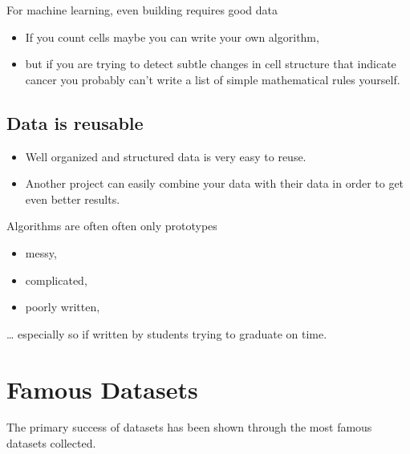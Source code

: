 \documentclass[letterpaper,10pt,english]{sphinxmanual}
\begin{document}
\sphinxAtStartPar
For machine learning, even building requires good data
\begin{itemize}
\item {} 
\sphinxAtStartPar
If you count cells maybe you can write your own algorithm,

\item {} 
\sphinxAtStartPar
but if you are trying to detect subtle changes in cell structure that indicate cancer you probably can’t write a list of simple mathematical rules yourself.

\end{itemize}


\section{Data is reusable}
\label{\detokenize{03-Datasets:data-is-reusable}}\begin{itemize}
\item {} 
\sphinxAtStartPar
Well organized and structured data is very easy to reuse.

\item {} 
\sphinxAtStartPar
Another project can easily combine your data with their data in order to get even better results.

\end{itemize}

\sphinxAtStartPar
Algorithms are often often only prototypes
\begin{itemize}
\item {} 
\sphinxAtStartPar
messy,

\item {} 
\sphinxAtStartPar
complicated,

\item {} 
\sphinxAtStartPar
poorly written,

\end{itemize}

\sphinxAtStartPar
… especially so if written by students trying to graduate on time.





\sphinxAtStartPar
{}






\chapter{Famous Datasets}
\label{\detokenize{03-Datasets:famous-datasets}}
\sphinxAtStartPar
The primary success of datasets has been shown through the most famous datasets collected.
\end{document}

